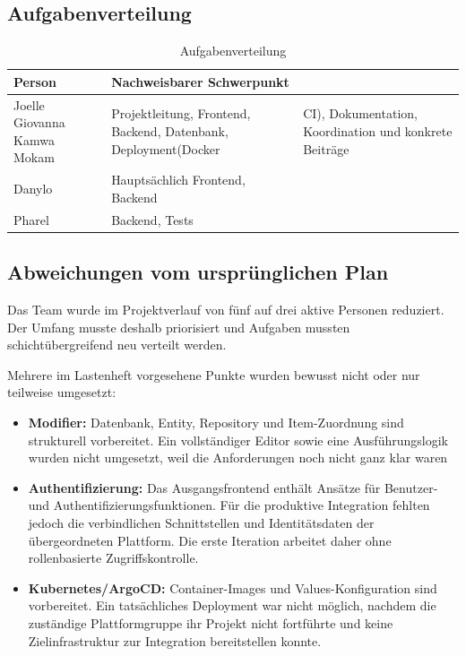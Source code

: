 ﻿\documentclass[11pt,a4paper]{article}
\begin{document}
\subsection{Aufgabenverteilung}
\begin{table}[H]\centering
\begin{tabularx}{\linewidth}{@{}l Y@{}}\toprule
\textbf{Person}&\textbf{Nachweisbarer Schwerpunkt}\\\midrule
{Joelle Giovanna Kamwa Mokam}&Projektleitung, Frontend, Backend, Datenbank, Deployment(Docker & CI), Dokumentation, Koordination und konkrete Beiträge\\
{Danylo}&Hauptsächlich Frontend, Backend\\
{Pharel}&Backend, Tests\\
\bottomrule
\end{tabularx}
\caption{Aufgabenverteilung}
\end{table}

\subsection{Abweichungen vom ursprünglichen Plan}
Das Team wurde im Projektverlauf von fünf auf drei aktive Personen reduziert.
Der Umfang musste deshalb priorisiert und Aufgaben mussten
schichtübergreifend neu verteilt werden.

Mehrere im Lastenheft vorgesehene Punkte wurden bewusst nicht oder nur
teilweise umgesetzt:
\begin{itemize}
\item \textbf{Modifier:} Datenbank, Entity, Repository und Item-Zuordnung sind
strukturell vorbereitet. Ein vollständiger Editor sowie eine
Ausführungslogik wurden nicht umgesetzt, weil die Anforderungen noch nicht ganz klar waren
\item \textbf{Authentifizierung:} Das Ausgangsfrontend enthält Ansätze für
Benutzer- und Authentifizierungsfunktionen. Für die produktive Integration
fehlten jedoch die verbindlichen Schnittstellen und Identitätsdaten der
übergeordneten Plattform. Die erste Iteration arbeitet daher ohne
rollenbasierte Zugriffskontrolle.
\item \textbf{Kubernetes/ArgoCD:} Container-Images und Values-Konfiguration
sind vorbereitet. Ein tatsächliches Deployment war nicht möglich, nachdem
die zuständige Plattformgruppe ihr Projekt nicht fortführte und keine
Zielinfrastruktur zur Integration bereitstellen konnte.
\end{itemize}
\end{document}
